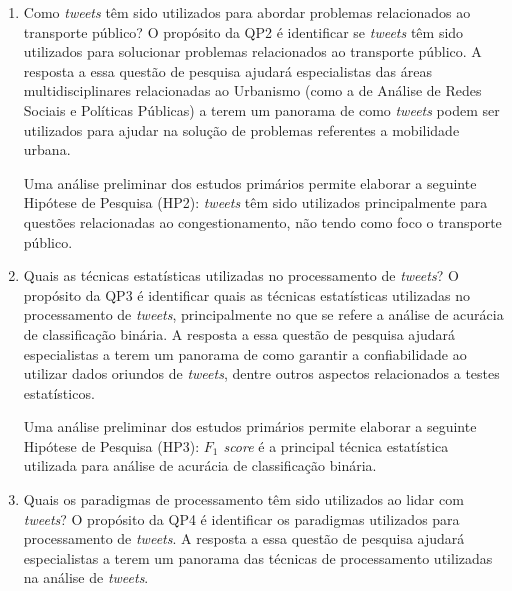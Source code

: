 \documentclass[
	12pt,				%
	oneside,			%
	a4paper,			%
	english,			%
	brazil				%
	]{abntex2ppgsi}
\begin{document}
{{\begin{enumerate}
Uma análise preliminar dos estudos primários permite elaborar a seguinte  alguns dos problemas urbanos abordados estão relacionados ao transporte, mobilidade urbana, turismo e desastres naturais. \newline

\item Como \textit{tweets} têm sido utilizados para abordar problemas relacionados ao transporte público? \newline \newline
\label{item:2}
O propósito da QP2 é identificar se \textit{tweets} têm sido utilizados para solucionar problemas relacionados ao transporte público. A resposta a essa questão de pesquisa ajudará especialistas das áreas multidisciplinares relacionadas ao Urbanismo (como a de Análise de Redes Sociais e Políticas Públicas) a terem um panorama de como \textit{tweets} podem ser utilizados para ajudar na solução de problemas referentes a mobilidade urbana. \newline

Uma análise preliminar dos estudos primários permite elaborar a seguinte Hipótese de Pesquisa (HP2): \textit{tweets} têm sido utilizados principalmente para questões relacionadas ao congestionamento, não tendo como foco o transporte público.\newline

\item Quais as técnicas estatísticas utilizadas no processamento de \textit{tweets}?
\label{item:3} \newline \newline
O propósito da QP3 é identificar quais as técnicas estatísticas utilizadas no processamento de \textit{tweets}, principalmente no que se refere a análise de acurácia de classificação binária. A resposta a essa questão de pesquisa ajudará especialistas a terem um panorama de como garantir a confiabilidade ao utilizar dados oriundos de \textit{tweets}, dentre outros aspectos relacionados a testes estatísticos. \newline

Uma análise preliminar dos estudos primários permite elaborar a seguinte Hipótese de Pesquisa (HP3): \textit{${F_1}$ score} é a principal técnica estatística utilizada para análise de acurácia de classificação binária.\newline

\item Quais os paradigmas de processamento têm sido utilizados ao lidar com \textit{tweets}?
\label{item:4} \newline \newline
O propósito da QP4 é identificar os paradigmas utilizados para processamento de \textit{tweets}. A resposta a essa questão de pesquisa ajudará especialistas a terem um panorama das técnicas de processamento utilizadas na análise de \textit{tweets}. \newline


\end{enumerate}}}
\end{document}
